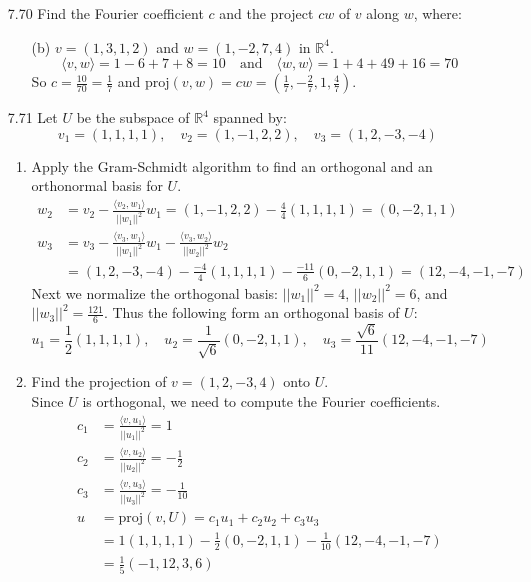 \documentclass[12pt]{article}
\theoremstyle{definition}
\theoremstyle{plain}
\begin{document}
\begin{enumerate}
\item[7.70]Find the Fourier coefficient $c$ and the project $cw$ of $v$ along $w$, where:
	\begin{enumerate}
	\item[(b)] $v=(1,3,1,2)$ and $w=(1,-2,7,4)$ in $\mathbb{R}^4$.
		\[ \langle v,w \rangle=1-6+7+8=10 \quad \mathrm{and} \quad \langle w,w \rangle=1+4+49+16=70 \]
		So $c=\frac{10}{70}=\frac{1}{7}$ and $\mathrm{proj}(v,w)=cw=(\frac{1}{7},-\frac{2}{7},1,\frac{4}{7})$.
	\end{enumerate}

\item[7.71]Let $U$ be the subspace of $\mathbb{R}^4$ spanned by:
\[ v_1=(1,1,1,1), \quad v_2=(1,-1,2,2), \quad v_3=(1,2,-3,-4) \]
	\begin{enumerate}
	\item Apply the Gram-Schmidt algorithm to find an orthogonal and an orthonormal basis for $U$.
		\begin{align*}
		w_2&=v_2-\frac{\langle v_2,w_1\rangle}{||w_1||^2}w_1 = (1,-1,2,2)-\frac{4}{4}(1,1,1,1) = (0,-2,1,1)\\
		w_3&=v_3-\frac{\langle v_3,w_1 \rangle}{||w_1||^2}w_1-\frac{ \langle v_3,w_2 \rangle}{||w_2||^2}w_2\\
		&= (1,2,-3,-4)-\frac{-4}{4}(1,1,1,1)-\frac{-11}{6}(0,-2,1,1) = (12,-4,-1,-7)
		\end{align*}
		Next we normalize the orthogonal basis: $||w_1||^2 = 4$, $||w_2||^2=6$, and $||w_3||^2=\frac{121}{6}$. Thus the following form an orthogonal basis of $U$:
		\[ u_1=\frac{1}{2}(1,1,1,1), \quad u_2=\frac{1}{\sqrt{6}}(0,-2,1,1), \quad u_3 = \frac{\sqrt{6}}{11}(12,-4,-1,-7) \]
	\item Find the projection of $v=(1,2,-3,4)$ onto $U$.\\
	Since $U$ is orthogonal, we need to compute the Fourier coefficients.
	\begin{align*}
	c_1 &= \frac{\langle v,u_1 \rangle}{||u_1||^2} = 1\\
	c_2 &= \frac{\langle v,u_2 \rangle}{||u_2||^2} = -\frac{1}{2}\\
	c_3 &= \frac{\langle v,u_3 \rangle}{||u_3||^2} = -\frac{1}{10}\\
	u&=\mathrm{proj}(v,U)=c_1u_1+c_2u_2+c_3u_3\\
	&= 1(1,1,1,1)-\frac{1}{2}(0,-2,1,1)-\frac{1}{10}(12,-4,-1,-7)\\
	&= \frac{1}{5}(-1,12,3,6)
	\end{align*}
	\end{enumerate}


\end{enumerate}
\end{document}
